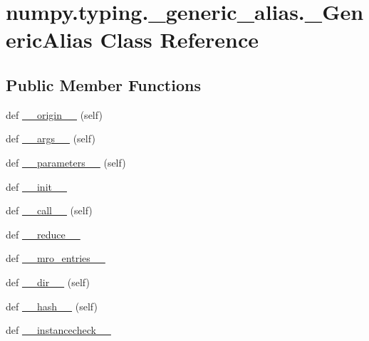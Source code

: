 \hypertarget{classnumpy_1_1typing_1_1__generic__alias_1_1__GenericAlias}{}\section{numpy.\+typing.\+\_\+generic\+\_\+alias.\+\_\+\+Generic\+Alias Class Reference}
\label{classnumpy_1_1typing_1_1__generic__alias_1_1__GenericAlias}
\subsection*{Public Member Functions}
\begin{DoxyCompactItemize}
\item 
def \hyperlink{classnumpy_1_1typing_1_1__generic__alias_1_1__GenericAlias_ae50f5e0f8a3627bfe97f629a6d4362c4}{\+\_\+\+\_\+origin\+\_\+\+\_\+} (self)
\item 
def \hyperlink{classnumpy_1_1typing_1_1__generic__alias_1_1__GenericAlias_aa85b23e6660a7fad17bb187d554a4e6b}{\+\_\+\+\_\+args\+\_\+\+\_\+} (self)
\item 
def \hyperlink{classnumpy_1_1typing_1_1__generic__alias_1_1__GenericAlias_ad69a67285d28b69c36798e15dcebb050}{\+\_\+\+\_\+parameters\+\_\+\+\_\+} (self)
\item 
def \hyperlink{classnumpy_1_1typing_1_1__generic__alias_1_1__GenericAlias_a95d0acb49cd6cfb065d89e03b01be90a}{\+\_\+\+\_\+init\+\_\+\+\_\+}
\item 
def \hyperlink{classnumpy_1_1typing_1_1__generic__alias_1_1__GenericAlias_aaf039afc09f1654abf6c411a914e1424}{\+\_\+\+\_\+call\+\_\+\+\_\+} (self)
\item 
def \hyperlink{classnumpy_1_1typing_1_1__generic__alias_1_1__GenericAlias_a69fe5c9c313a86723b8839a9e4342859}{\+\_\+\+\_\+reduce\+\_\+\+\_\+}
\item 
def \hyperlink{classnumpy_1_1typing_1_1__generic__alias_1_1__GenericAlias_af74fbe66074cd62e03c7465d39e54da1}{\+\_\+\+\_\+mro\+\_\+entries\+\_\+\+\_\+}
\item 
def \hyperlink{classnumpy_1_1typing_1_1__generic__alias_1_1__GenericAlias_a891fa7b59f6583456d76f38bb22fd726}{\+\_\+\+\_\+dir\+\_\+\+\_\+} (self)
\item 
def \hyperlink{classnumpy_1_1typing_1_1__generic__alias_1_1__GenericAlias_ab1c2b4588417bbfaf781d0b7ced80198}{\+\_\+\+\_\+hash\+\_\+\+\_\+} (self)
\item 
def \hyperlink{classnumpy_1_1typing_1_1__generic__alias_1_1__GenericAlias_a5c7277bed4f5d6d994c701b7503e6849}{\+\_\+\+\_\+instancecheck\+\_\+\+\_\+}

\end{DoxyCompactItemize}
